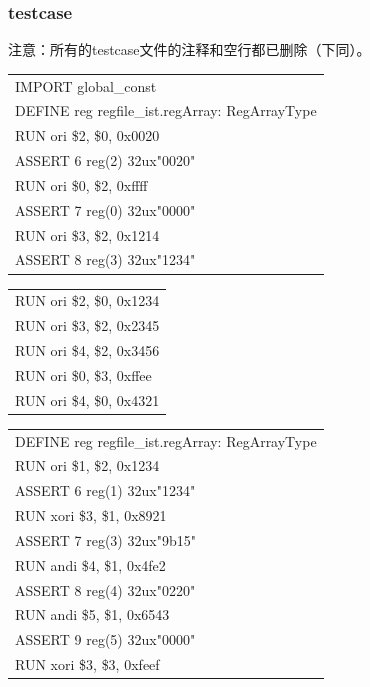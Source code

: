 \documentclass[11pt,utf8]{article}
\begin{document}
{{\subsubsection{testcase} {
注意：所有的testcase文件的注释和空行都已删除（下同）。
\begin{center}	\begin{longtable}{p{15cm}} \hline
		IMPORT{ }global\_const\\
		DEFINE{ }reg{ }regfile\_ist.regArray:{ }RegArrayType\\
		RUN{ }ori{ }\$2,{ }\$0,{ }0x0020\\
		ASSERT{ }6{ }reg(2){ }32ux"0020"\\
		RUN{ }ori{ }\$0,{ }\$2,{ }0xffff\\
		ASSERT{ }7{ }reg(0){ }32ux"0000"\\
		RUN{ }ori{ }\$3,{ }\$2,{ }0x1214\\
		ASSERT{ }8{ }reg(3){ }32ux"1234"\\
		\hline \end{longtable} \end{center}
\begin{center}	\begin{longtable}{p{15cm}} \hline
		RUN{ }ori{ }\$2,{ }\$0,{ }0x1234\\
		RUN{ }ori{ }\$3,{ }\$2,{ }0x2345\\
		RUN{ }ori{ }\$4,{ }\$2,{ }0x3456\\
		RUN{ }ori{ }\$0,{ }\$3,{ }0xffee\\
		RUN{ }ori{ }\$4,{ }\$0,{ }0x4321\\
		\hline \end{longtable} \end{center}
\begin{center}	\begin{longtable}{p{15cm}} \hline
		DEFINE{ }reg{ }regfile\_ist.regArray:{ }RegArrayType\\
		RUN{ }ori{ }\$1,{ }\$2,{ }0x1234\\
		ASSERT{ }6{ }reg(1){ }32ux"1234"\\
		RUN{ }xori{ }\$3,{ }\$1,{ }0x8921\\
		ASSERT{ }7{ }reg(3){ }32ux"9b15"\\
		RUN{ }andi{ }\$4,{ }\$1,{ }0x4fe2\\
		ASSERT{ }8{ }reg(4){ }32ux"0220"\\
		RUN{ }andi{ }\$5,{ }\$1,{ }0x6543\\
		ASSERT{ }9{ }reg(5){ }32ux"0000"\\
		RUN{ }xori{ }\$3,{ }\$3,{ }0xfeef\\

\end{longtable}
\end{center}}}}
\end{document}
